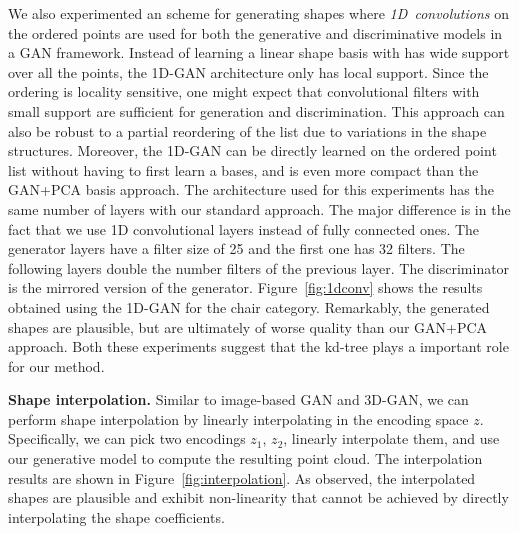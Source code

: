 We also experimented an scheme for generating shapes where \emph{1D~convolutions} on the ordered points are used for both the generative and discriminative models in a GAN framework. Instead of learning a linear shape basis with has wide support over all the points, the 1D-GAN architecture only has local support. Since the ordering is locality sensitive, one might expect that convolutional filters with small support are sufficient for generation and discrimination. This approach can also be robust to a partial reordering of the list due to variations in the shape structures. Moreover, the 1D-GAN can be directly learned on the ordered point list without having to first learn a bases, and is even more compact than the GAN+PCA basis approach. The architecture used for this experiments has the same number of layers with our standard approach. The major difference is in the fact that we use 1D convolutional layers instead of fully connected ones. The generator layers have a filter size of 25 and the first one has 32 filters. The following layers double the number filters of the previous layer. The discriminator is the mirrored version of the generator. Figure~\ref{fig:1dconv} shows the results obtained using the 1D-GAN for the chair category. Remarkably, the generated shapes are plausible, but are ultimately of worse quality than our GAN+PCA approach. Both these experiments suggest that the kd-tree plays a important role for our method.

\vspace{12pt}
\noindent \textbf{Shape interpolation.} Similar to image-based GAN and 3D-GAN, we can perform shape interpolation by linearly interpolating in the encoding space $z$. Specifically, we can pick two encodings $z_1$, $z_2$, linearly interpolate them, and use our generative model to compute the resulting point cloud. The interpolation results are shown in Figure~\ref{fig:interpolation}. As observed, the interpolated shapes are plausible and exhibit non-linearity that cannot be achieved by directly interpolating the shape coefficients.



